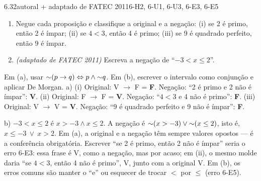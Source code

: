 \begin{exemplo}{6.3}{2}{autoral + adaptado de FATEC 2011}{6-H2, 6-U1, 6-U3, 6-E3, 6-E5}\label{ex:6.3}
\begin{enumerate}[label=\alph*)]
  \item Negue cada proposição e classifique a original e a negação: (i) se 2 é primo, então 2 é ímpar; (ii) se $4<3$, então 4 é primo; (iii) se 9 é quadrado perfeito, então 9 é ímpar.
  \item \emph{(adaptado de FATEC 2011)} Escreva a negação de \enquote{$-3<x\le2$}.
\end{enumerate}
\plano Em (a), usar ${{\sim}}(p\rightarrow q)\Leftrightarrow p\wedge{{\sim}}q$. Em (b), escrever o intervalo como conjunção e aplicar De Morgan.
\resolucao
a) (i) Original: V $\rightarrow$ F = \textbf{F}. Negação: \enquote{2 é primo e 2 não é ímpar}: \textbf{V}.
(ii) Original: F $\rightarrow$ F = \textbf{V}. Negação: \enquote{$4<3$ e 4 não é primo}: \textbf{F}.
(iii) Original: V $\rightarrow$ V = \textbf{V}. Negação: \enquote{9 é quadrado perfeito e 9 não é ímpar}: \textbf{F}.
\par b) $-3<x\le2$ é $x>-3\wedge x\le2$. A negação é ${{\sim}}(x>-3)\vee{{\sim}}(x\le2)$, isto é, $x\le-3\ \vee\ x>2$.
\comentario Em (a), a original e a negação têm sempre valores opostos — é a conferência obrigatória. Escrever \enquote{se 2 é primo, então 2 não é ímpar} seria o erro 6-E3: essa frase é V, como a negação, mas por acaso; em (ii), o mesmo molde daria \enquote{se $4<3$, então 4 não é primo}, V, junto com a original V. Em (b), os erros comuns são manter o \enquote{e} ou esquecer de trocar $<$ por $\le$ (erro 6-E5).
\end{exemplo}

